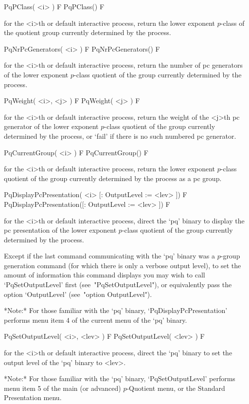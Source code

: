 \>PqPClass( <i> ) F
\>PqPClass() F

for the <i>th or default interactive {\ANUPQ} process, return  the  lower
exponent $p$-class of the quotient  group  currently  determined  by  the
process.


\>PqNrPcGenerators( <i> ) F
\>PqNrPcGenerators() F

for the <i>th or default interactive {\ANUPQ} process, return the  number
of pc generators of the lower exponent $p$-class quotient  of  the  group
currently determined by the process.

\>PqWeight( <i>, <j> ) F
\>PqWeight( <j> ) F

for the <i>th or default interactive {\ANUPQ} process, return the  weight
of the <j>th pc generator of the lower exponent $p$-class quotient of the
group currently determined by the process, or `fail' if there is no  such
numbered pc generator.

\>PqCurrentGroup( <i> ) F
\>PqCurrentGroup() F

for the <i>th or default interactive {\ANUPQ} process, return  the  lower
exponent $p$-class quotient of the  group  currently  determined  by  the
process as a {\GAP} pc group.

\>PqDisplayPcPresentation( <i> [: OutputLevel := <lev> ]) F
\>PqDisplayPcPresentation([: OutputLevel := <lev> ]) F

for the <i>th or default interactive {\ANUPQ} process,  direct  the  `pq'
binary to display the pc presentation of  the  lower  exponent  $p$-class
quotient of the group currently determined by the process.

Except if the last command communicating  with  the  `pq'  binary  was  a
$p$-group generation command (for which there is only  a  verbose  output
level), to set the amount of information this command  displays  you  may
wish  to  call  `PqSetOutputLevel'  first  (see~"PqSetOutputLevel"),   or
equivalently pass the option `OutputLevel' (see~"option OutputLevel").

*Note:*
For  those  familiar  with  the  `pq'  binary,  `PqDisplayPcPresentation'
performs menu item 4 of the current menu of the `pq' binary.

\>PqSetOutputLevel( <i>, <lev> ) F
\>PqSetOutputLevel( <lev> ) F

for the <i>th or default interactive {\ANUPQ} process,  direct  the  `pq'
binary to set the output level of the `pq' binary to <lev>.

*Note:* For those  familiar  with  the  `pq'  binary,  `PqSetOutputLevel'
performs menu item 5 of the main (or advanced) $p$-Quotient menu, or  the
Standard Presentation menu.

